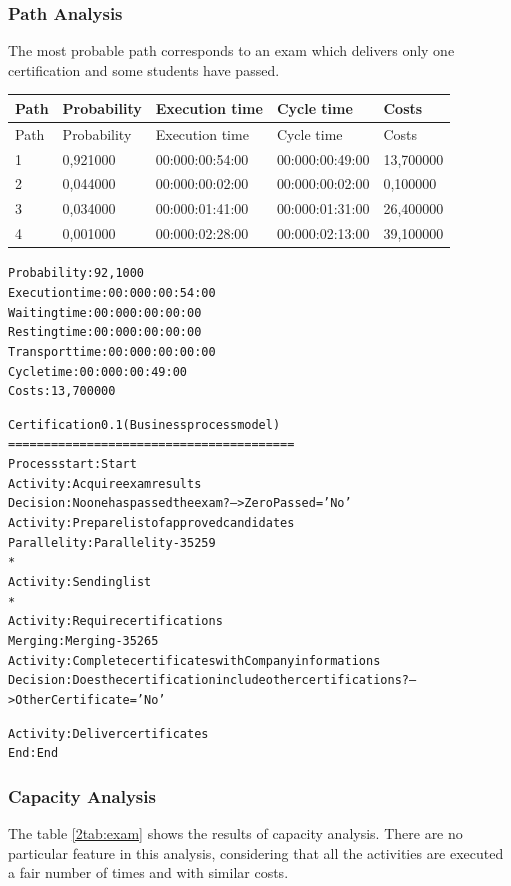 \subsubsection{Path Analysis}
The most probable path corresponds to an exam which delivers only one
certification and some students have passed.

\begin{table}[ht!]
\centering
\begin{tabular}{|l|l|l|l|l|}
\hline
Path&Probability&Execution time&Cycle time&Costs\\
\hline
Path&Probability&Execution time&Cycle time&Costs\\
\hline
1&0,921000&00:000:00:54:00&00:000:00:49:00&13,700000\\
\hline
2&0,044000&00:000:00:02:00&00:000:00:02:00&0,100000\\
\hline
3&0,034000&00:000:01:41:00&00:000:01:31:00&26,400000\\
\hline
4&0,001000&00:000:02:28:00&00:000:02:13:00&39,100000\\
\hline
\end{tabular}
\end{table}

\begin{alltt}
Probability:   92,1000%
Execution time:  00:000:00:54:00
Waiting time:  00:000:00:00:00
Resting time:  00:000:00:00:00
Transport time:  00:000:00:00:00
Cycle time:  00:000:00:49:00
Costs:  13,700000

Certification 0.1 (Business process model)
========================================
Process start: Start
Activity: Acquire exam results
Decision: No one has passed the exam? --> ZeroPassed='No'
Activity: Prepare list of approved candidates
Parallelity: Parallelity-35259
    *
    Activity: Sending list
    *
    Activity: Require certifications
Merging: Merging-35265
Activity: Complete certificates with Company informations
Decision: Does the certification include other certifications? --> OtherCertificate='No'

Activity: Deliver certificates
End: End
\end{alltt}

\subsubsection{Capacity Analysis}
The table \ref{2tab:exam} shows the results of capacity analysis.
There are no particular feature in this analysis, considering that all the
activities are executed a fair number of times and with similar costs.

